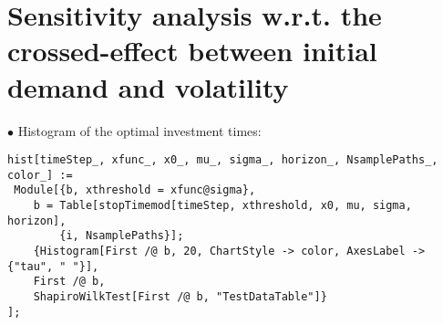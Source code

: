\pagebreak
\section{Sensitivity analysis w.r.t. the crossed-effect between initial demand and volatility}

$\bullet$ Histogram of the optimal investment times:
\begin{lstlisting}
hist[timeStep_, xfunc_, x0_, mu_, sigma_, horizon_, NsamplePaths_, color_] :=
 Module[{b, xthreshold = xfunc@sigma},
	b = Table[stopTimemod[timeStep, xthreshold, x0, mu, sigma, horizon],
		{i, NsamplePaths}];
	{Histogram[First /@ b, 20, ChartStyle -> color, AxesLabel -> {"tau", " "}],
	First /@ b, 
	ShapiroWilkTest[First /@ b, "TestDataTable"]}
];
\end{lstlisting}

